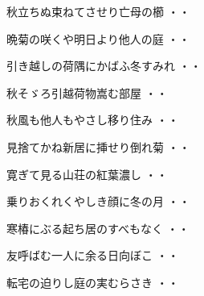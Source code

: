 \begin{shiika}秋立ちぬ束ねてさせり亡母の櫛
\hfill{・・}\end{shiika}
\vspace{0.6cm}
\begin{shiika}晩菊の咲くや明日より他人の庭
\hfill{・・}\end{shiika}
\vspace{0.6cm}
\begin{shiika}引き越しの荷隅にかばふ冬すみれ
\hfill{・・}\end{shiika}
\vspace{0.6cm}
\begin{shiika}秋そゞろ引越荷物嵩む部屋
\hfill{・・}\end{shiika}
\vspace{0.6cm}
\begin{shiika}秋風も他人もやさし移り住み
\hfill{・・}\end{shiika}
\vspace{0.6cm}
\begin{shiika}見捨てかね新居に挿せり倒れ菊
\hfill{・・}\end{shiika}
\vspace{0.6cm}
\begin{shiika}寛ぎて見る山荘の紅葉濃し
\hfill{・・}\end{shiika}
\vspace{0.6cm}
\begin{shiika}乗りおくれくやしき顔に冬の月
\hfill{・・}\end{shiika}
\vspace{0.6cm}
\begin{shiika}寒椿にぶる起ち居のすべもなく
\hfill{・・}\end{shiika}
\vspace{0.6cm}
\begin{shiika}友呼ばむ一人に余る日向ぼこ
\hfill{・・}\end{shiika}
\vspace{0.6cm}
\begin{shiika}転宅の迫りし庭の実むらさき
\hfill{・・}\end{shiika}
\vspace{0.6cm}
